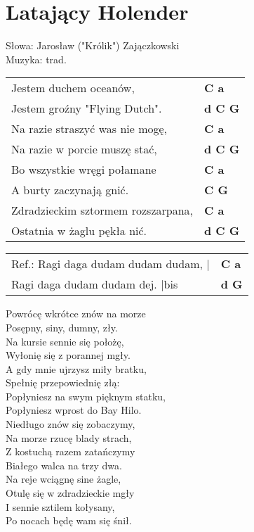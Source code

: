 \section{Latający Holender}

Słowa: Jarosław ("Królik") Zajączkowski\\
Muzyka:  trad.

\vspace{2em}
\begin{tabular}{@{}p{9cm}@{}l@{}}
Jestem duchem oceanów, & \bfseries  C a \\
Jestem groźny "Flying Dutch". & \bfseries  d C G \\
Na razie straszyć was nie mogę, & \bfseries C a \\
Na razie w porcie muszę stać, & \bfseries  d C G \\
Bo wszystkie wręgi połamane & \bfseries  C a \\
A burty zaczynają gnić. & \bfseries  C G \\
Zdradzieckim sztormem rozszarpana, & \bfseries C a \\
Ostatnia w żaglu pękła nić. & \bfseries d C G \\
\end{tabular}

\vspace{1em}
\begin{tabular}{@{}p{9cm}@{}l@{}}
Ref.: Ragi daga dudam dudam dudam,  | & \bfseries  C a \\
Ragi daga dudam dudam dej.    |bis  & \bfseries d G \\
\end{tabular}

\vspace{1em}
Powrócę wkrótce znów na morze \\
Posępny, siny, dumny, zły. \\
Na kursie sennie się położę, \\
Wyłonię się z porannej mgły. \\
A gdy mnie ujrzysz miły bratku, \\
Spełnię przepowiednię złą: \\
Popłyniesz na swym pięknym statku, \\
Popłyniesz wprost do Bay Hilo. \\

Niedługo znów się zobaczymy, \\
Na morze rzucę blady strach, \\
Z kostuchą razem zatańczymy \\
Białego walca na trzy dwa. \\
Na reje wciągnę sine żagle, \\
Otulę się w zdradzieckie mgły \\
I sennie sztilem kołysany, \\
Po nocach będę wam się śnił.
